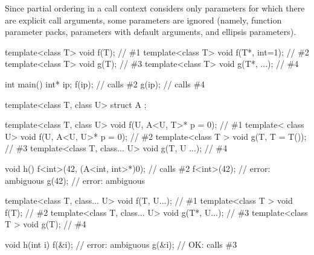 \pnum
\begin{note} Since partial ordering in a call context considers only parameters
for which there are explicit call arguments, some parameters are ignored (namely,
function parameter packs, parameters with default arguments, and ellipsis
parameters).
\begin{example}

\begin{codeblock}
template<class T> void f(T);                            // \#1
template<class T> void f(T*, int=1);                    // \#2
template<class T> void g(T);                            // \#3
template<class T> void g(T*, ...);                      // \#4

\end{codeblock}
\begin{codeblock}
int main() {
  int* ip;
  f(ip);                                                // calls \#2
  g(ip);                                                // calls \#4
}
\end{codeblock}
\end{example}\begin{example}
\begin{codeblock}
template<class T, class U> struct A { };

template<class T, class U> void f(U, A<U, T>* p = 0);   // \#1
template<         class U> void f(U, A<U, U>* p = 0);   // \#2
template<class T         > void g(T, T = T());          // \#3
template<class T, class... U> void g(T, U ...);         // \#4

void h() {
  f<int>(42, (A<int, int>*)0);                          // calls \#2
  f<int>(42);                                           // error: ambiguous
  g(42);                                                // error: ambiguous
}
\end{codeblock}
\end{example}\begin{example}
\begin{codeblock}
template<class T, class... U> void f(T, U...);          // \#1
template<class T            > void f(T);                // \#2
template<class T, class... U> void g(T*, U...);         // \#3
template<class T            > void g(T);                // \#4

void h(int i) {
  f(&i);                                                // error: ambiguous
  g(&i);                                                // OK: calls \#3
}
\end{codeblock}
\end{example}\end{note}

